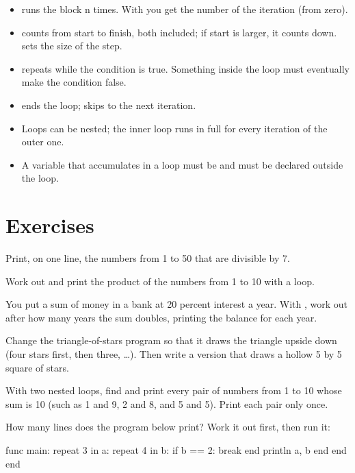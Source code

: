 \begin{summary}
\begin{itemize}
  \item {} runs the block n times. With
         you get the number of the iteration (from
        zero).
  \item {} counts from start to finish,
        both included; if start is larger, it counts down.  sets
        the size of the step.
  \item {} repeats while the condition is true.
        Something inside the loop must eventually make the condition
        false.
  \item {} ends the loop;  skips to the next
        iteration.
  \item Loops can be nested; the inner loop runs in full for every
        iteration of the outer one.
  \item A variable that accumulates in a loop must be  and must
        be declared outside the loop.
\end{itemize}
\end{summary}

\section*{Exercises}

\exercise Print, on one line, the numbers from 1 to 50 that are divisible by
7.

\exercise Work out and print the product of the numbers from 1 to 10 with a
loop.

\exercise You put a sum of money in a bank at 20 percent interest a year.
With , work out after how many years the sum doubles, printing
the balance for each year.

\exercise Change the triangle-of-stars program so that it draws the
triangle upside down (four stars first, then three, \ldots). Then write a
version that draws a hollow 5 by 5 square of stars.

\exercise With two nested loops, find and print every pair of numbers from 1
to 10 whose sum is 10 (such as 1 and 9, 2 and 8, and 5 and 5). Print each
pair only once.

\exercise How many lines does the program below print? Work it out first,
then run it:
\begin{salamcode}
func main:
    repeat 3 in a:
        repeat 4 in b:
            if b == 2: break end
            println a, b
        end
    end
end
\end{salamcode}
